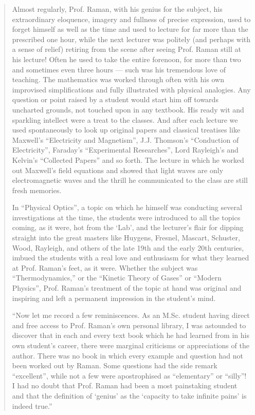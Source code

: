 \begin{quote}
{Almost regularly, Prof. Raman, with his genius for the subject, his extraordinary eloquence, imagery and fullness of precise expression, used to forget himself as well as the time and used to lecture for far more than the prescribed one hour, while the next lecturer was politely (and perhaps with a sense of relief) retiring from the scene after seeing Prof. Raman still at his lecture! Often he used to take the entire forenoon, for more than two and sometimes even three hours --- such was his tremendous love of teaching. The mathematics was worked through often with his own improvised simplifications and fully illustrated with physical analogies. Any question or point raised by a student would start him off towards uncharted grounds, not touched upon in any textbook. His ready wit and sparkling intellect were a treat to the classes. And after each lecture we used spontaneously to look up original papers and classical treatises like Maxwell's ``Electricity and Magnetism'', J.J. Thomson's ``Conduction of Electricity'', Faraday's ``Experimental Researches'', Lord Rayleigh's and Kelvin's ``Collected Papers'' and so forth. The lecture in which he worked out Maxwell's field equations and showed that light waves are only electromagnetic waves and the thrill he communicated to the class are still fresh memories.

In ``Physical Optics'', a topic on which he himself was conducting several investigations at the time, the students were introduced to all the topics coming, as it were, hot from the `Lab', and the lecturer's flair for dipping straight into the great masters like Huygens, Fresnel, Mascart, Schuster, Wood, Rayleigh, and others of the late 19th and the early 20th centuries, imbued the students with a real love and enthusiasm for what they learned at Prof. Raman's feet, as it were. Whether the subject was ``Thermodynamics,'' or the ``Kinetic Theory of Gases'' or ``Modern Physics'', Prof. Raman's treatment of the topic at hand was original and inspiring and left a permanent impression in the student's mind.

``Now let me record a few reminiscences. As an M.Sc. student having direct and free access to Prof. Raman's own personal library, I was astounded to discover that in each and every text book which he had learned from in his own student's career, there were marginal criticisms or appreciations of the author. There was no book in which every example and question had not been worked out by Raman. Some questions had the side remark ``excellent'', while not a few were \hbox{apostrophised} as ``elementary'' or ``silly''! I had no doubt that Prof. Raman had been a most painstaking student and that the definition of `genius' as the `capacity to take infinite pains' is indeed true.''}\relax
\end{quote}

